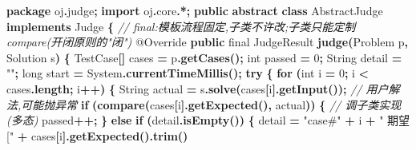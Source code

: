 \documentclass[
  11pt,
]{ctexart}
\newenvironment{Shaded}{\begin{snugshade}}{\end{snugshade}}
\newcommand{\AttributeTok}[1]{\textcolor[rgb]{0.13,0.29,0.53}{#1}}
\newcommand{\BuiltInTok}[1]{#1}
\newcommand{\CommentTok}[1]{\textcolor[rgb]{0.56,0.35,0.01}{\textit{#1}}}
\newcommand{\ControlFlowTok}[1]{\textcolor[rgb]{0.13,0.29,0.53}{\textbf{#1}}}
\newcommand{\DataTypeTok}[1]{\textcolor[rgb]{0.13,0.29,0.53}{#1}}
\newcommand{\DecValTok}[1]{\textcolor[rgb]{0.00,0.00,0.81}{#1}}
\newcommand{\FunctionTok}[1]{\textcolor[rgb]{0.13,0.29,0.53}{\textbf{#1}}}
\newcommand{\ImportTok}[1]{#1}
\newcommand{\KeywordTok}[1]{\textcolor[rgb]{0.13,0.29,0.53}{\textbf{#1}}}
\newcommand{\NormalTok}[1]{#1}
\newcommand{\OperatorTok}[1]{\textcolor[rgb]{0.81,0.36,0.00}{\textbf{#1}}}
\newcommand{\StringTok}[1]{\textcolor[rgb]{0.31,0.60,0.02}{#1}}
\begin{document}
\begin{Shaded}
\begin{Highlighting}[]
\KeywordTok{package}\ImportTok{ oj}\OperatorTok{.}\ImportTok{judge}\OperatorTok{;}
\KeywordTok{import} \ImportTok{oj}\OperatorTok{.}\ImportTok{core}\OperatorTok{.*;}
\KeywordTok{public} \KeywordTok{abstract} \KeywordTok{class}\NormalTok{ AbstractJudge }\KeywordTok{implements}\NormalTok{ Judge }\OperatorTok{\{}
    \CommentTok{// final:模板流程固定,子类不许改;子类只能定制 compare(开闭原则的"闭")}
    \AttributeTok{@Override}
    \KeywordTok{public} \DataTypeTok{final}\NormalTok{ JudgeResult }\FunctionTok{judge}\OperatorTok{(}\NormalTok{Problem p}\OperatorTok{,}\NormalTok{ Solution s}\OperatorTok{)} \OperatorTok{\{}
\NormalTok{        TestCase}\OperatorTok{[]}\NormalTok{ cases }\OperatorTok{=}\NormalTok{ p}\OperatorTok{.}\FunctionTok{getCases}\OperatorTok{();}
        \DataTypeTok{int}\NormalTok{ passed }\OperatorTok{=} \DecValTok{0}\OperatorTok{;}
        \BuiltInTok{String}\NormalTok{ detail }\OperatorTok{=} \StringTok{""}\OperatorTok{;}
        \DataTypeTok{long}\NormalTok{ start }\OperatorTok{=} \BuiltInTok{System}\OperatorTok{.}\FunctionTok{currentTimeMillis}\OperatorTok{();}
        \ControlFlowTok{try} \OperatorTok{\{}
            \ControlFlowTok{for} \OperatorTok{(}\DataTypeTok{int}\NormalTok{ i }\OperatorTok{=} \DecValTok{0}\OperatorTok{;}\NormalTok{ i }\OperatorTok{\textless{}}\NormalTok{ cases}\OperatorTok{.}\FunctionTok{length}\OperatorTok{;}\NormalTok{ i}\OperatorTok{++)} \OperatorTok{\{}
                \BuiltInTok{String}\NormalTok{ actual }\OperatorTok{=}\NormalTok{ s}\OperatorTok{.}\FunctionTok{solve}\OperatorTok{(}\NormalTok{cases}\OperatorTok{[}\NormalTok{i}\OperatorTok{].}\FunctionTok{getInput}\OperatorTok{());}   \CommentTok{// 用户解法,可能抛异常}
                \ControlFlowTok{if} \OperatorTok{(}\FunctionTok{compare}\OperatorTok{(}\NormalTok{cases}\OperatorTok{[}\NormalTok{i}\OperatorTok{].}\FunctionTok{getExpected}\OperatorTok{(),}\NormalTok{ actual}\OperatorTok{))} \OperatorTok{\{}  \CommentTok{// 调子类实现(多态)}
\NormalTok{                    passed}\OperatorTok{++;}
                \OperatorTok{\}} \ControlFlowTok{else} \ControlFlowTok{if} \OperatorTok{(}\NormalTok{detail}\OperatorTok{.}\FunctionTok{isEmpty}\OperatorTok{())} \OperatorTok{\{}
\NormalTok{                    detail }\OperatorTok{=} \StringTok{"case\#"} \OperatorTok{+}\NormalTok{ i }\OperatorTok{+} \StringTok{" 期望["} \OperatorTok{+}\NormalTok{ cases}\OperatorTok{[}\NormalTok{i}\OperatorTok{].}\FunctionTok{getExpected}\OperatorTok{().}\FunctionTok{trim}\OperatorTok{()}

\end{Highlighting}
\end{Shaded}
\end{document}
